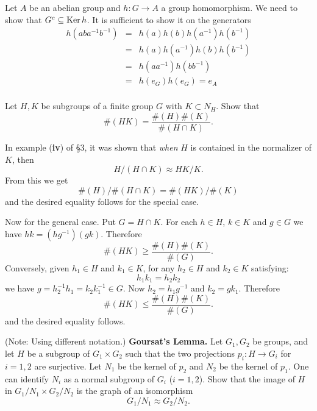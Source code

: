 \documentclass[12pt]{book}
\def\Ker{\mathop{\rm Ker}\nolimits}
\newcounter{myenumi}
\newenvironment{myenumerate}
{\begin{enumerate}
 \setcounter{enumi}{\themyenumi}
}
{\setcounter{myenumi}{\theenumi}
 \end{enumerate}}
\begin{document}
\begin{myenumerate}
Let $A$ be an abelian group and
\(h: G\rightarrow A\) a group homomorphism.
We need to show that \(G^c \subseteq \Ker h\).
It is sufficient to show it on the generators
\begin{eqnarray*}
h(aba^{-1}b^{-1}) & = & h(a)h(b)h(a^{-1})h(b^{-1}) \\
                  & = & h(a)h(a^{-1})h(b)h(b^{-1}) \\
                  & = & h(aa^{-1})h(bb^{-1}) \\
                  & = & h(e_G)h(e_G) = e_A\\
\end{eqnarray*}


\begin{excopy}
Let \(H,K\) be subgroups of a finite group $G$
with \(K \subset N_H\). Show that
\[\#(HK) = \frac{\#(H)\#(K)}{\#(H\cap K)}.\]
\end{excopy}

In example (\textbf{iv}) of \S 3,
it was shown that \emph{when} $H$ is contained in the normalizer of $K$, then
\[H/(H\cap K) \approx HK/K.\]
From this we get
\[\#(H)/\#(H\cap K) = \#(HK)/\#(K)\]
and the desired equality follows for the special case.

Now for the general case. Put \(G = H\cap K\).
For each \(h\in H\), \(k\in K\) and \(g\in G\)
we have \(hk = (hg^{-1})(gk)\).
Therefore
\begin{equation*}
\#(HK) \geq \frac{\#(H)\#(K)}{\#(G)}.
\end{equation*}
Conversely, given \(h_1\in H\) and \(k_1\in K\),
for any \(h_2\in H\) and \(k_2\in K\) satisfying:
\begin{equation*}
  h_1 k_1 = h_2 k_2 %
\end{equation*}
we have \(g = h_2^{-1}h_1 = k_2k_1^{-1} \in G\).
Now \(h_2 = h_1 g^{-1}\) and \(k_2 = gk_1\).
Therefore
\begin{equation*}
\#(HK) \leq \frac{\#(H)\#(K)}{\#(G)}.
\end{equation*}
and the desired equality follows.

\begin{excopy}
{\normalsize (Note: Using different notation.)}\newline
\textbf{Goursat's Lemma.} Let \(G_1, G_2\) be groups,
and let $H$ be a subgroup of \(G_1\times G_2\) such that
the two projections
\(p_i:H\rightarrow G_i\) for \(i=1,2\) are surjective.
Let \(N_1\) be the kernel of \(p_2\)
and \(N_2\) be the kernel of \(p_1\).
One can identify \(N_i\) as a normal subgroup of \(G_i\) (\(i=1,2\)).
Show that the image of $H$
in \(G_1/N_1 \times G_2/N_2\) is the graph of an isomorphism
\[G_1/N_1 \approx G_2/N_2.\]
\end{excopy}


\end{myenumerate}
\end{document}
